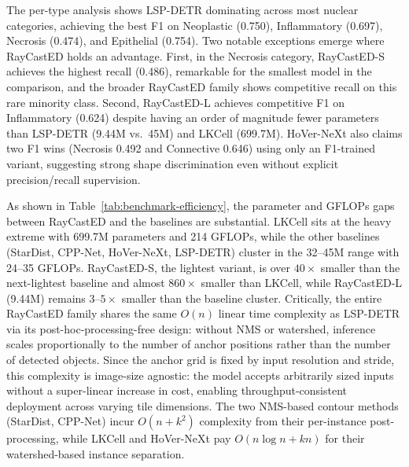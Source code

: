 

The per-type analysis shows LSP-DETR dominating across most nuclear categories, achieving the best F1 on Neoplastic (0.750), Inflammatory (0.697), Necrosis (0.474), and Epithelial (0.754). Two notable exceptions emerge where RayCastED holds an advantage. First, in the Necrosis category, RayCastED-S achieves the highest recall (0.486), remarkable for the smallest model in the comparison, and the broader RayCastED family shows competitive recall on this rare minority class. Second, RayCastED-L achieves competitive F1 on Inflammatory (0.624) despite having an order of magnitude fewer parameters than LSP-DETR (9.44M vs.\ 45M) and LKCell (699.7M). HoVer-NeXt also claims two F1 wins (Necrosis 0.492 and Connective 0.646) using only an F1-trained variant, suggesting strong shape discrimination even without explicit precision/recall supervision.



As shown in Table~\ref{tab:benchmark-efficiency}, the parameter and GFLOPs gaps between RayCastED and the baselines are substantial. LKCell sits at the heavy extreme with 699.7M parameters and 214 GFLOPs, while the other baselines (StarDist, CPP-Net, HoVer-NeXt, LSP-DETR) cluster in the 32--45M range with 24--35 GFLOPs. RayCastED-S, the lightest variant, is over $40\times$ smaller than the next-lightest baseline and almost $860\times$ smaller than LKCell, while RayCastED-L (9.44M) remains $3$--$5\times$ smaller than the baseline cluster. Critically, the entire RayCastED family shares the same $O(n)$ linear time complexity as LSP-DETR via its post-hoc-processing-free design: without NMS or watershed, inference scales proportionally to the number of anchor positions rather than the number of detected objects. Since the anchor grid is fixed by input resolution and stride, this complexity is image-size agnostic: the model accepts arbitrarily sized inputs without a super-linear increase in cost, enabling throughput-consistent deployment across varying tile dimensions. The two NMS-based contour methods (StarDist, CPP-Net) incur $O(n+k^2)$ complexity from their per-instance post-processing, while LKCell and HoVer-NeXt pay $O(n \log n + kn)$ for their watershed-based instance separation.

